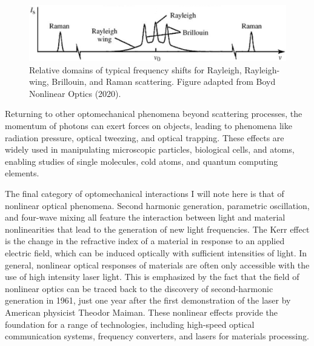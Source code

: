 
\begin{figure}[t] %
\centering
\includegraphics[width=\textwidth]{figs/1-Intro/Boyd scattering frequency shift domains.png}
\caption{Relative domains of typical frequency shifts for Rayleigh, Rayleigh-wing, Brillouin, and Raman scattering. Figure adapted from Boyd Nonlinear Optics (2020). \cite{boyd2020nonlinear}}
\label{fig:Introduction:scattering-domains}
\end{figure}

Returning to other optomechanical phenomena beyond scattering processes, the momentum of photons can exert forces on objects, leading to phenomena like radiation pressure, optical tweezing, and optical trapping. These effects are widely used in manipulating microscopic particles\cite{}, biological cells\cite{}, and atoms\cite{}, enabling studies of single molecules\cite{}, cold atoms\cite{}, and quantum computing elements\cite{}.

The final category of optomechanical interactions I will note here is that of nonlinear optical phenomena. Second harmonic generation, parametric oscillation, and four-wave mixing all feature the interaction between light and material nonlinearities that lead to the generation of new light frequencies.\cite{boyd2020nonlinear} The Kerr effect is the change in the refractive index of a material in response to an applied electric field, which can be induced optically with sufficient intensities of light. In general, nonlinear optical responses of materials are often only accessible with the use of high intensity laser light. This is emphasized by the fact that the field of nonlinear optics can be traced back to the discovery of second-harmonic generation in 1961\cite{franken1961generation}, just one year after the first demonstration of the laser by American physicist Theodor Maiman.\cite{maiman1960stimulated} These nonlinear effects provide the foundation for a range of technologies, including high-speed optical communication systems\cite{}, frequency converters\cite{}, and lasers for materials processing\cite{}.

